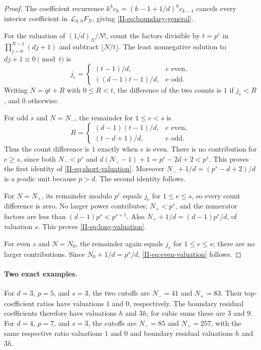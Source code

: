 \documentclass[11pt,letterpaper]{article}
\numberwithin{equation}{section}
\begin{document}
\begin{proof}
The coefficient recurrence
$k^hc_k=(k-1+1/d)^hc_{k-1}$ cancels every interior coefficient
in $\mathcal L_{d,h}F_N$, giving \eqref{II-eq:boundary-general}.

For the valuation of $(1/d)_N/N!$, count the factors divisible by
$t=p^e$ in $\prod_{j=0}^{N-1}(dj+1)$ and subtract $\lfloor N/t\rfloor$.
The least nonnegative solution to $dj+1\equiv0\pmod t$ is
\[
 j_e=\begin{cases}
 (t-1)/d,&e\text{ even},\\
 ((d-1)t-1)/d,&e\text{ odd}.
 \end{cases}
\]
Writing $N=qt+R$ with $0\leq R<t$, the difference of the two counts
is $1$ if $j_e<R$, and $0$ otherwise.

For odd $s$ and $N=N_-$, the remainder for $1\leq e<s$ is
\[
 R=\begin{cases}
 (d-1)(t-1)/d,&e\text{ even},\\
 (t-d+1)/d,&e\text{ odd}.
 \end{cases}
\]
Thus the count difference is $1$ exactly when $e$ is even.
There is no contribution for $e\geq s$, since both $N_-<p^s$ and
$d(N_--1)+1=p^s-2d+2<p^s$. This proves the first identity
of \eqref{II-eq:short-valuation}. Moreover
$N_-+1/d=(p^s-d+2)/d$ is a $p$-adic unit because $p>d$.
The second identity follows.

For $N=N_+$, its remainder modulo $p^e$ equals $j_e$ for
$1\leq e\leq s$, so every count difference is zero. No larger
power contributes: $N_+<p^s$, and the numerator factors are
less than $(d-1)p^s<p^{s+1}$. Also
$N_++1/d=(d-1)p^s/d$, of valuation $s$.
This proves \eqref{II-eq:long-valuation}.

For even $s$ and $N=N_0$, the remainder again equals $j_e$ for
$1\leq e\leq s$; there are no larger contributions. Since
$N_0+1/d=p^s/d$, \eqref{II-eq:even-valuation} follows.
\end{proof}

\paragraph{Two exact examples.}
For $d=3$, $p=5$, and $s=3$, the two cutoffs are $N_-=41$ and
$N_+=83$. Their top-coefficient ratios have valuations $1$ and $0$,
respectively. The boundary residual coefficients therefore have
valuations $h$ and $3h$; for cubic sums these are $3$ and $9$.
For $d=4$, $p=7$, and $s=3$, the cutoffs are $N_-=85$ and
$N_+=257$, with the same respective ratio valuations $1$ and $0$
and boundary residual valuations $h$ and $3h$.
\end{document}

